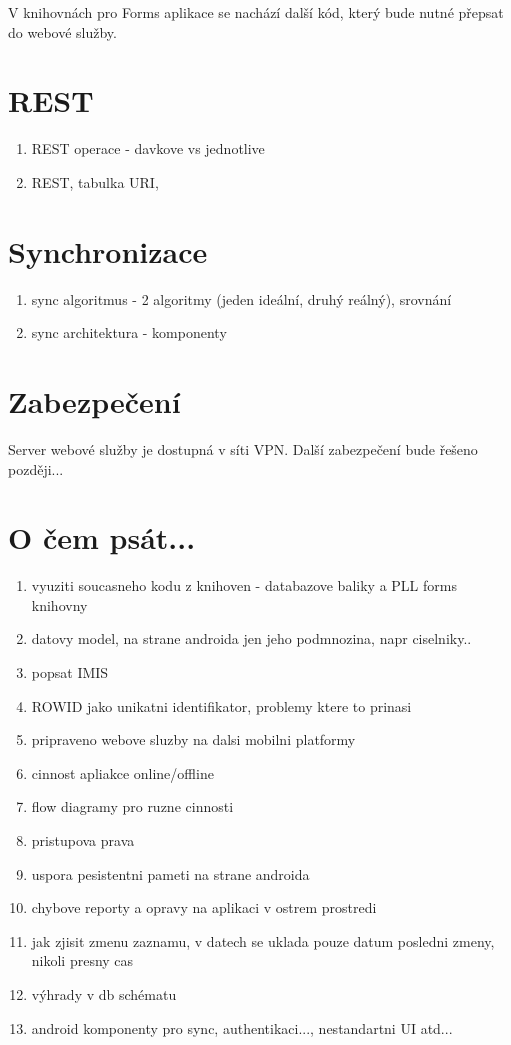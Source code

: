 \documentclass{bakalarka}
\begin{document}
V knihovnách pro Forms aplikace se nachází další kód, který bude nutné přepsat do webové služby.
\section{REST}
\begin{enumerate}
\item REST operace - davkove vs jednotlive
\item REST, tabulka URI, 
\end{enumerate}

\section{Synchronizace}
\begin{enumerate}
\item sync algoritmus - 2 algoritmy (jeden ideální, druhý reálný), srovnání
\item sync architektura - komponenty
\end{enumerate}

\section{Zabezpečení}
Server webové služby je dostupná v síti VPN. Další zabezpečení bude řešeno později...

\section{O čem psát...}
\begin{enumerate}
\item vyuziti soucasneho kodu z knihoven - databazove baliky a PLL forms knihovny
\item datovy model, na strane androida jen jeho podmnozina, napr ciselniky..
\item popsat IMIS 
\item ROWID jako unikatni identifikator, problemy ktere to prinasi
\item pripraveno webove sluzby na dalsi mobilni platformy
\item cinnost apliakce online/offline
\item flow diagramy pro ruzne cinnosti
\item pristupova prava
\item uspora pesistentni pameti na strane androida
\item chybove reporty a opravy na aplikaci v ostrem prostredi
\item jak zjisit zmenu zaznamu, v datech se uklada pouze datum posledni zmeny, nikoli presny cas
\item výhrady v db schématu
\item android komponenty pro sync, authentikaci..., nestandartni UI atd...
\end{enumerate}

\appendix

%
\end{document}

